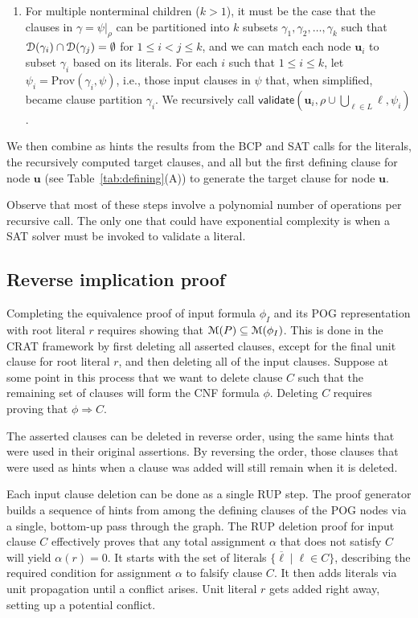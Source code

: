 \documentclass[letterpaper,USenglish,cleveref, autoref, thm-restate]{lipics-v2021}
\newcommand{\obar}[1]{\overline{#1}}
\newcommand{\lit}{\ell}
\newcommand{\dependencyset}{{\cal D}}
\newcommand{\imply}{\Rightarrow}
\newcommand{\assign}{\alpha}
\newcommand{\passign}{\rho}
\newcommand{\modelset}{{\cal M}}
\newcommand{\validate}{\textsf{validate}}
\newcommand{\prov}{\textrm{Prov}}
\newcommand{\inputformula}{\phi_I}
\newcommand{\makenode}[1]{\mathbf{#1}}
\newcommand{\nodeu}{\makenode{u}}
\newcommand{\simplify}[2]{#1|_{#2}}
\begin{document}
\begin{enumerate}
\begin{enumerate}
\item For multiple nonterminal children ($k > 1$),
  it must be the case that the clauses in
  $\gamma = \simplify{\psi}{\passign}$ can be partitioned into $k$ subsets
  $\gamma_1, \gamma_2, \ldots, \gamma_k$ such that $\dependencyset(\gamma_i)
  \cap \dependencyset(\gamma_j) = \emptyset$ for $1 \leq i < j \leq k$,
  and we can match each node $\nodeu_i$ to subset $\gamma_i$ based on its
  literals.
  For each $i$ such that $1 \leq i \leq k$, let $\psi_i = \prov(\gamma_i, \psi)$, i.e., those input clauses in $\psi$ that, when simplified, became clause partition $\gamma_i$.
  We recursively call
  $\validate \left(\nodeu_i, \passign \cup \bigcup_{\lit \in L} \lit, \psi_i\right)$.
\end{enumerate}
  We then combine as hints the results from the BCP and SAT calls for
  the literals, the recursively computed target clauses, and all but
  the first defining clause for node $\nodeu$
(see Table~\ref{tab:defining}(A))
to generate the target clause for node $\nodeu$.
\end{enumerate}
Observe that most of these steps involve a polynomial number of
operations per recursive call.  The only one that could have
exponential complexity is when a SAT solver must be invoked to validate a
literal.

\subsection{Reverse implication proof}

Completing the equivalence proof of input formula $\inputformula$ and its POG
representation with root literal $r$ requires showing that
$\modelset(P) \subseteq \modelset(\inputformula)$.  This is done in the
CRAT framework by first deleting all asserted clauses, except for the
final unit clause for root literal $r$, and then deleting all of the
input clauses.  Suppose at some point in this process that we want to
delete clause $C$ such that the remaining set of clauses will form the
CNF formula $\phi$.  Deleting $C$ requires proving that
$\phi \imply C$.


The asserted clauses can be deleted in reverse order, using the same
hints that were used in their original assertions.  By reversing the
order, those clauses that were used as hints when a clause was
added will still remain when it is deleted.

Each input clause deletion can be done as a single RUP step.  The
proof generator builds a sequence of hints from among the defining
clauses of the POG nodes via a single, bottom-up pass through the
graph.  The RUP deletion proof for input clause $C$ effectively proves that any
total assignment $\assign$ that does not satisfy $C$ will yield
$\assign(r) = 0$.  It starts with the set of literals
$\{ \obar{\lit} \mid \lit \in C\}$, describing the required condition for
assignment $\assign$ to falsify clause $C$.
It then
adds literals via unit propagation until a
conflict arises.    Unit literal $r$ gets
added right away, setting up a potential conflict.
\end{document}

